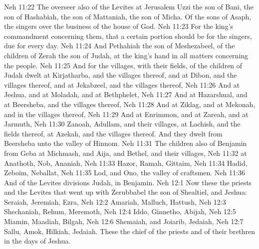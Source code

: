 \vs Neh 11:22 The overseer also of the Levites at Jerusalem  Uzzi the son of Bani, the son of Hashabiah, the son of Mattaniah, the son of Micha. Of the sons of Asaph, the singers  over the business of the house of God.
\vs Neh 11:23 For  the king's commandment concerning them, that a certain portion should be for the singers, due for every day.
\vs Neh 11:24 And Pethahiah the son of Meshezabeel, of the children of Zerah the son of Judah,  at the king's hand in all matters concerning the people.
\vs Neh 11:25 And for the villages, with their fields,  of the children of Judah dwelt at Kirjatharba, and  the villages thereof, and at Dibon, and  the villages thereof, and at Jekabzeel, and  the villages thereof,
\vs Neh 11:26 And at Jeshua, and at Moladah, and at Bethphelet,
\vs Neh 11:27 And at Hazarshual, and at Beersheba, and  the villages thereof,
\vs Neh 11:28 And at Ziklag, and at Mekonah, and in the villages thereof,
\vs Neh 11:29 And at Enrimmon, and at Zareah, and at Jarmuth,
\vs Neh 11:30 Zanoah, Adullam, and  their villages, at Lachish, and the fields thereof, at Azekah, and  the villages thereof. And they dwelt from Beersheba unto the valley of Hinnom.
\vs Neh 11:31 The children also of Benjamin from Geba  at Michmash, and Aija, and Bethel, and  their villages,
\vs Neh 11:32  at Anathoth, Nob, Ananiah,
\vs Neh 11:33 Hazor, Ramah, Gittaim,
\vs Neh 11:34 Hadid, Zeboim, Neballat,
\vs Neh 11:35 Lod, and Ono, the valley of craftsmen.
\vs Neh 11:36 And of the Levites  divisions  Judah,  in Benjamin.
\vs Neh 12:1 Now these  the priests and the Levites that went up with Zerubbabel the son of Shealtiel, and Jeshua: Seraiah, Jeremiah, Ezra,
\vs Neh 12:2 Amariah, Malluch, Hattush,
\vs Neh 12:3 Shechaniah, Rehum, Meremoth,
\vs Neh 12:4 Iddo, Ginnetho, Abijah,
\vs Neh 12:5 Miamin, Maadiah, Bilgah,
\vs Neh 12:6 She\-ma\-i\-ah, and Joiarib, Jedaiah,
\vs Neh 12:7 Sal\-lu, Amok, Hil\-ki\-ah, Je\-da\-i\-ah. These  the chief of the priests and of their brethren in the days of Jeshua.
